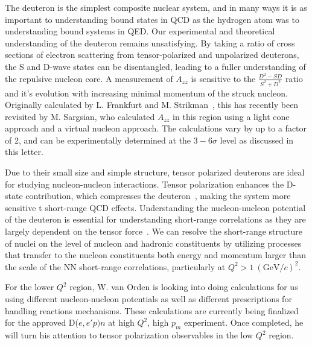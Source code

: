 
The deuteron is the simplest composite nuclear system, and in many ways it is as important to understanding bound states in QCD as the hydrogen atom was to understanding bound systems in QED.  Our experimental and theoretical understanding of the deuteron remains unsatisfying. By taking a ratio of cross sections of electron scattering from tensor-polarized and unpolarized deuterons, the S and D-wave states can be disentangled, leading to a fuller understanding of the repulsive nucleon core. A measurement of $A_{zz}$ is sensitive to the $\frac{D^2-SD}{S^2+D^2}$ ratio and it's evolution with increasing minimal momentum of the struck nucleon. Originally calculated by L. Frankfurt and M. Strikman~\cite{Frankfurt:1988nt}, this has recently been revisited by M. Sargsian, who calculated $A_{zz}$ in this region using a light cone approach and a virtual nucleon approach. The calculations vary by up to a factor of 2, and can be experimentally determined at the $3-6\sigma$ level as discussed in this letter.


Due to their small size and simple structure, tensor polarized deuterons are ideal for studying nucleon-nucleon interactions. Tensor polarization enhances the D-state contribution, which compresses the deuteron~\cite{Forest:1996kp}, 
making the system more sensitive t short-range QCD effects. Understanding the nucleon-nucleon potential of the deuteron is essential for understanding short-range correlations as they are largely dependent on the tensor force~\cite{Arrington:2011xs}. We can resolve the short-range structure of nuclei on the level of nucleon and hadronic constituents by utilizing processes that transfer to the nucleon constituents both energy and momentum larger than the scale of the NN short-range correlations, particularly at $Q^2>1~(\mathrm{GeV}/c)^2$.

For the lower $Q^2$ region, W. van Orden is looking into doing calculations for us using different nucleon-nucleon potentials as well as different prescriptions for handling reactions mechanisms.   These calculations are currently being finalized for the approved
D($e,e'p)n$ at high $Q^2$, high $p_m$ experiment. Once completed, he will turn his attention to tensor polarization observables in the low $Q^2$ region.

